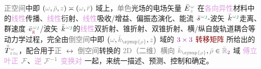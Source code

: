 \textcolor{gray}{正空间}中即 $\left( \mathcolor{gray}{\omega}, \mathcolor{gray}{\bar{\rho}}, \mathcolor{gray}{z} \right) \asymp \left( \mathcolor{gray}{\omega}, \mathcolor{gray}{\bar{r}} \right)$ 域上，\textcolor{gray}{单色}光场的电场矢量 $\bar{E}^{\;\!\mathcolor{gray}{\omega}}_{\;\!\mathcolor{gray}{z}}$ 在\textcolor{Plum}{各向异性}材料中的\textcolor{Plum}{线性}\textcolor{NavyBlue}{传播}、\textcolor{Plum}{线性}\textcolor{NavyBlue}{衍射}、\textcolor{Plum}{线性}\textcolor{NavyBlue}{吸收}/\textcolor{NavyBlue}{增益}、偏振态演化、\textcolor{PineGreen}{能流}$\xint{\begin{smallmatrix} ~ \\ {}^{}_{\mathcolor{gray}{-}} \\ ~ \end{smallmatrix}}{20}{\bar{s}}^{\;\! \mathcolor{gray}{\omega} \textcolor{PineGreen}{\jmath}}$-\textcolor{PineGreen}{波矢}$\xint{\begin{smallmatrix} ~ \\ {}^{}_{\mathcolor{gray}{-}} \\ ~ \end{smallmatrix}}{15}{\bar{k}}^{\;\! \mathcolor{gray}{\omega} \textcolor{PineGreen}{\jmath}}$走离、\textcolor{PineGreen}{群速度}$\xint{\begin{smallmatrix} ~ \\ {}^{}_{\mathcolor{gray}{-}} \\ ~ \end{smallmatrix}}{20}{\bar{v}}^{\;\! \mathcolor{gray}{\omega} \textcolor{PineGreen}{\jmath}}_{\textcolor{Maroon}{\text{g}}}$/\textcolor{PineGreen}{波矢}$\xint{\begin{smallmatrix} ~ \\ {}^{}_{\mathcolor{gray}{-}} \\ ~ \end{smallmatrix}}{15}{\bar{k}}^{\;\! \mathcolor{gray}{\omega} \textcolor{PineGreen}{\jmath}}$的\textcolor{Plum}{线性}\textcolor{PineGreen}{双折射}、\textcolor{PineGreen}{锥折射}、\textcolor{PineGreen}{双锥折射}、横/纵\textcolor{NavyBlue}{自旋轨道耦合}等动力学过程，完全由\textcolor{gray}{倒空间}中即 $\left( \mathcolor{gray}{\omega}, \mathcolor{gray}{\bar{k}_{\symup{\rho}}}, \mathcolor{gray}{z} \right)$ 域的 $\textcolor{Plum}{3 \times 3}$ \textcolor{Maroon}{转移矩阵}  所给出的 $\xint{\mathcolor{gray}{-}}{30}{\bar{\bar{T}}}^{\;\!\mathcolor{gray}{\omega}}_{\;\! \mathcolor{gray}{z} \mathcolor{gray}{z_0}}$，配合用于\textcolor{gray}{正} $\longleftrightarrow$ \textcolor{gray}{倒空间}转换的 \textcolor{gray}{2D（二维）}\textcolor{gray}{横向} $\mathcolor{gray}{\bar{k}_{\symup{\rho}}}, \mathcolor{gray}{\bar{\rho}} \in \mathcolor{gray}{\bar{\mathbb{R}}_{\textcolor{Plum}{2}}}$ 域 \textcolor{Plum}{傅立叶正} $\mathcolor{gray}{\mathcal F}$、\textcolor{Plum}{逆} $\mathcolor{gray}{\mathcal F^{-1}}$ \textcolor{Plum}{变换对}  一起，来统一描述、预测、控制和确定。


